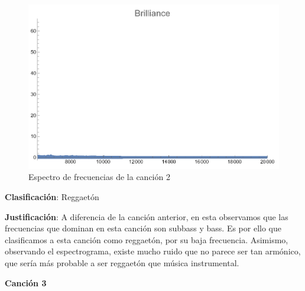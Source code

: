 \documentclass[12pt, letterpaper]{article}
\begin{document}
\begin{figure}[H]
\begin{minipage}{.3\textwidth}
  \end{minipage}
  \begin{minipage}{0.03\textwidth}\end{minipage}
  \begin{minipage}{.3\textwidth}
    \centering
    \includegraphics[width=.9\linewidth]{imgs/Cancion2/brilliance.png}
  \end{minipage}
  \caption{Espectro de frecuencias de la canción 2}
  \label{fig:esp02}
\end{figure}

\textbf{Clasificación}: Reggaetón

\textbf{Justificación}: A diferencia de la canción anterior, en esta
observamos que las frecuencias que dominan en esta canción son subbass y 
bass. Es por ello que clasificamos a esta canción como reggaetón, por su
baja frecuencia. Asimismo, observando el espectrograma, existe mucho ruido
que no parece ser tan armónico, que sería más probable a ser reggaetón que
música instrumental.

\newpage

\textbf{\large{Canción 3}}
\end{document}
